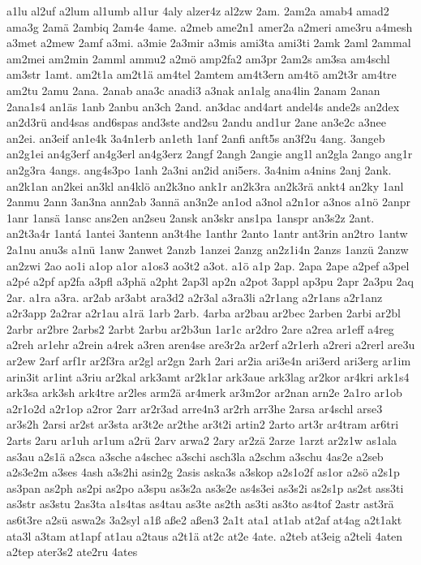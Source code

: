 {a1lu
al2uf
a2lum
al1umb
al1ur
4aly
alzer4z
al2zw
2am.
2am2a
amab4
amad2
ama3g
2amä
2ambiq
2am4e
4ame.
a2meb
ame2n1
amer2a
a2meri
ame3ru
a4mesh
a3met
a2mew
2amf
a3mi.
a3mie
2a3mir
a3mis
ami3ta
ami3ti
2amk
2aml
2ammal
am2mei
am2min
2amml
ammu2
a2mö
amp2fa2
am3pr
2am2s
am3sa
am4schl
am3str
1amt.
am2t1a
am2t1ä
am4tel
2amtem
am4t3ern
am4tö
am2t3r
am4tre
am2tu
2amu
2ana.
2anab
ana3c
anadi3
a3nak
an1alg
ana4lin
2anam
2anan
2ana1s4
an1äs
1anb
2anbu
an3ch
2and.
an3dac
and4art
andel4s
ande2s
an2dex
an2d3rü
and4sas
and6spas
and3ste
and2su
2andu
and1ur
2ane
an3e2c
a3nee
an2ei.
an3eif
an1e4k
3a4n1erb
an1eth
1anf
2anfi
anft5s
an3f2u
4ang.
3angeb
an2g1ei
an4g3erf
an4g3erl
an4g3erz
2angf
2angh
2angie
ang1l
an2gla
2ango
ang1r
an2g3ra
4angs.
ang4s3po
1anh
2a3ni
an2id
ani5ers.
3a4nim
a4nins
2anj
2ank.
an2k1an
an2kei
an3kl
an4klö
an2k3no
ank1r
an2k3ra
an2k3rä
ankt4
an2ky
1anl
2anmu
2ann
3an3na
ann2ab
3annä
an3n2e
an1od
a3nol
a2n1or
a3nos
a1nö
2anpr
1anr
1ansä
1ansc
ans2en
an2seu
2ansk
an3skr
ans1pa
1anspr
an3s2z
2ant.
an2t3a4r
1antá
1antei
3antenn
an3t4he
1anthr
2anto
1antr
ant3rin
an2tro
1antw
2a1nu
anu3s
a1nü
1anw
2anwet
2anzb
1anzei
2anzg
an2z1i4n
2anzs
1anzü
2anzw
an2zwi
2ao
ao1i
a1op
a1or
a1os3
ao3t2
a3ot.
a1ö
a1p
2ap.
2apa
2ape
a2pef
a3pel
a2pé
a2pf
ap2fa
a3pfl
a3phä
a2pht
2ap3l
ap2n
a2pot
3appl
ap3pu
2apr
2a3pu
2aq
2ar.
a1ra
a3ra.
ar2ab
ar3abt
ara3d2
a2r3al
a3ra3li
a2r1ang
a2r1ans
a2r1anz
a2r3app
2a2rar
a2r1au
a1rä
1arb
2arb.
4arba
ar2bau
ar2bec
2arben
2arbi
ar2bl
2arbr
ar2bre
2arbs2
2arbt
2arbu
ar2b3un
1ar1c
ar2dro
2are
a2rea
ar1eff
a4reg
a2reh
ar1ehr
a2rein
a4rek
a3ren
aren4se
are3r2a
ar2erf
a2r1erh
a2reri
a2rerl
are3u
ar2ew
2arf
arf1r
ar2f3ra
ar2gl
ar2gn
2arh
2ari
ar2ia
ari3e4n
ari3erd
ari3erg
ar1im
arin3it
ar1int
a3riu
ar2kal
ark3amt
ar2k1ar
ark3aue
ark3lag
ar2kor
ar4kri
ark1s4
ark3sa
ark3sh
ark4tre
ar2les
arm2ä
ar4merk
ar3m2or
ar2nan
arn2e
2a1ro
ar1ob
a2r1o2d
a2r1op
a2ror
2arr
ar2r3ad
arre4n3
ar2rh
arr3he
2arsa
ar4schl
arse3
ar3s2h
2arsi
ar2st
ar3sta
ar3t2e
ar2the
ar3t2i
artin2
2arto
art3r
ar4tram
ar6tri
2arts
2aru
ar1uh
ar1um
a2rü
2arv
arwa2
2ary
ar2zä
2arze
1arzt
ar2z1w
as1ala
as3au
a2s1ä
a2sca
a3sche
a4schec
a3schi
asch3la
a2schm
a3schu
4as2e
a2seb
a2s3e2m
a3ses
4ash
a3s2hi
asin2g
2asis
aska3s
a3skop
a2s1o2f
as1or
a2sö
a2s1p
as3pan
as2ph
as2pi
as2po
a3spu
as3s2a
as3s2e
as4s3ei
as3s2i
as2s1p
as2st
ass3ti
as3str
as3stu
2as3ta
a1s4tas
as4tau
as3te
as2th
as3ti
as3to
as4tof
2astr
ast3rä
as6t3re
a2sü
aswa2s
3a2syl
a1ß
aße2
aßen3
2a1t
ata1
at1ab
at2af
at4ag
a2t1akt
ata3l
a3tam
at1apf
at1au
a2taus
a2t1ä
at2c
at2e
4ate.
a2teb
at3eig
a2teli
4aten
a2tep
ater3s2
ate2ru
4ates
}
